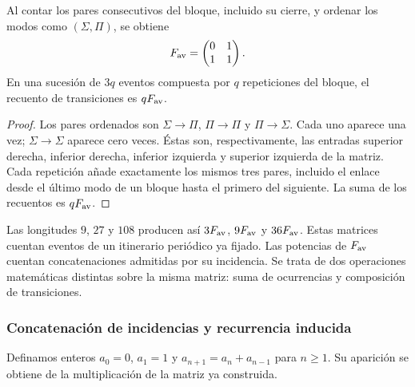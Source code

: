 \begin{proposicion}
\label{prop:cal-incidencia}
Al contar los pares consecutivos del bloque, incluido su cierre, y ordenar
los modos como $(\Sigma,\Pi)$, se obtiene
\begin{equation}
 F_{\rm av}=\begin{pmatrix}0&1\\1&1\end{pmatrix}.
 \label{eq:cal-incidencia}
\end{equation}
En una sucesión de $3q$ eventos compuesta por $q$ repeticiones del bloque,
el recuento de transiciones es $qF_{\rm av}$.
\end{proposicion}
\begin{proof}
Los pares ordenados son $\Sigma\to\Pi$, $\Pi\to\Pi$ y
$\Pi\to\Sigma$. Cada uno aparece una vez; $\Sigma\to\Sigma$
aparece cero veces. Éstas son, respectivamente, las entradas superior
derecha, inferior derecha, inferior izquierda y superior izquierda de la
matriz. Cada repetición añade exactamente los mismos tres pares, incluido
el enlace desde el último modo de un bloque hasta el primero del siguiente.
La suma de los recuentos es $qF_{\rm av}$.
\end{proof}

Las longitudes $9$, $27$ y $108$ producen así $3F_{\rm av}$,
$9F_{\rm av}$ y $36F_{\rm av}$. Estas matrices cuentan eventos de un
itinerario periódico ya fijado. Las potencias de $F_{\rm av}$ cuentan
concatenaciones admitidas por su incidencia. Se trata de dos operaciones
matemáticas distintas sobre la misma matriz: suma de ocurrencias y
composición de transiciones.

\subsubsection{Concatenación de incidencias y recurrencia inducida}

Definamos enteros $a_0=0$, $a_1=1$ y
$a_{n+1}=a_n+a_{n-1}$ para $n\geq1$. Su aparición se obtiene de la
multiplicación de la matriz ya construida.

